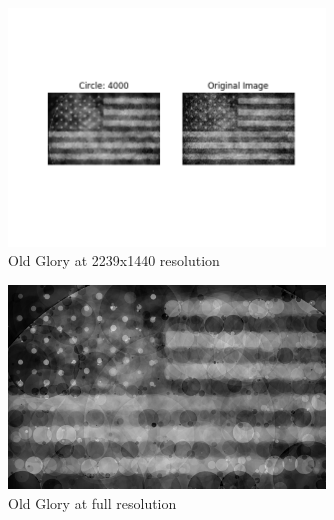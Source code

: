 \documentclass[12pt]{article}
\begin{document}
\begin{figure}[H]
\centering
\noindent\includegraphics[width=0.75\textwidth]{../results/old_glory/old_glory_4000}
\caption{Old Glory at 2239x1440 resolution}
\label{fig:old_glory}
\end{figure}

\begin{figure}[H]
\centering
\noindent\includegraphics[width=0.75\textwidth]{../results/old_glory/old_glory_raw_4000}
\caption{Old Glory at full resolution}
\label{fig:old_glory_raw}
\end{figure}






\newpage
\end{document}
